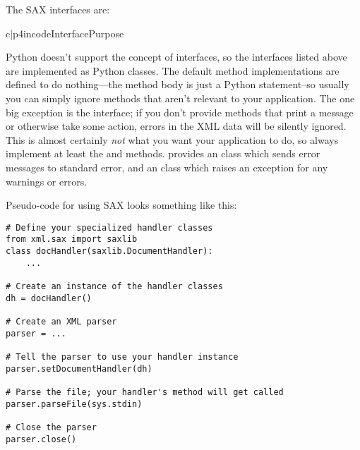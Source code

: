 \documentclass{howto}
\begin{document}
The SAX interfaces are:

\begin{tableii}{c|p{4in}}{code}{Interface}{Purpose}





\end{tableii}

Python doesn't support the concept of interfaces, so the interfaces
listed above are implemented as Python classes.  The default method
implementations are defined to do nothing---the method body is just a
Python  statement--so usually you can simply ignore methods
that aren't relevant to your application.  The one big exception is
the  interface; if you don't provide methods that
print a message or otherwise take some action, errors in the XML data
will be silently ignored.  This is almost certainly \emph{not} what
you want your application to do, so always implement at least the
 and  methods.
 provides an  class which
sends error messages to standard error, and an 
class which raises an exception for any warnings or errors.

Pseudo-code for using SAX looks something like this:
\begin{verbatim}
# Define your specialized handler classes
from xml.sax import saxlib
class docHandler(saxlib.DocumentHandler):
    ...

# Create an instance of the handler classes
dh = docHandler()

# Create an XML parser
parser = ...

# Tell the parser to use your handler instance
parser.setDocumentHandler(dh)

# Parse the file; your handler's method will get called
parser.parseFile(sys.stdin)

# Close the parser
parser.close()
\end{verbatim}
\end{document}
